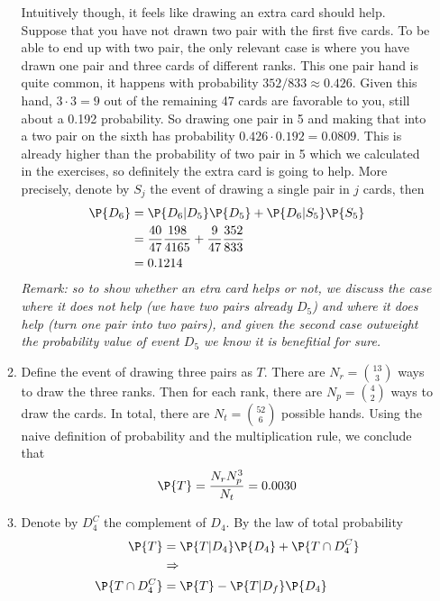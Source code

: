 \begin{exercise}
\begin{solution}
\begin{enumerate}
\begin{enumerate}
				Intuitively  though, it feels like drawing an extra card should help. Suppose that you have not drawn two pair with the first five cards. To be able to end up with two pair, the only relevant case is where you have drawn one pair and three cards of different ranks. This one pair hand is quite common, it happens with probability $352/833\approx 0.426$. Given this hand, $3\cdot 3=9$ out of the remaining 47 cards are favorable to you, still about a 0.192 probability. So drawing one pair in 5 and making that into a two pair on the sixth has probability $0.426\cdot 0.192=0.0809$. This is already higher than the probability of two pair in 5 which we calculated in the exercises, so definitely the extra card is going to help. More precisely, denote by $S_j$ the event of drawing a single pair in $j$ cards, then
				\begin{align*}
					\P{D_6} &= \P{D_6|D_5} \P{D_5} + \P{D_6|S_5}\P{S_5}\\
					&=\frac{40}{47}\frac{198}{4165} + \frac{9}{47}\frac{352}{833}\\
					& = 0.1214
				\end{align*}
				\textit{Remark: so to show whether an etra card helps or not, we discuss the case where it does not help (we have two pairs already $D_5$) and where it does help (turn one pair into two pairs), and given the second case outweight the probability value of event $D_5$ we know it is benefitial for sure.}
				\item Define the event of drawing three pairs as $T$. There are $N_{r} = {13 \choose 3}$ ways to draw the three ranks. Then for each rank, there are $N_{p} = {4 \choose 2}$ ways to draw the cards. In total, there are $N_{t} = {52 \choose 6}$ possible hands. Using the naive definition of probability and the multiplication rule, we conclude that
				\begin{align*}
					\P{T} = \frac{N_{r}N_{p}^3}{N_{t}} = 0.0030
				\end{align*}
			\item Denote by $D_{4}^{C}$ the complement of $D_{4}$. By the law of total probability
			\begin{align*}
				\P{T} &= \P{T|D_{4}}\P{D_{4}} + \P{T\cap D_{4}^{C}}\\
				&\Rightarrow \\
				\P{T\cap D_{4}^{C}}&=\P{T}-\P{T|D_{f}}\P{D_{4}}
			\end{align*}

\end{enumerate}
\end{enumerate}
\end{solution}
\end{exercise}
